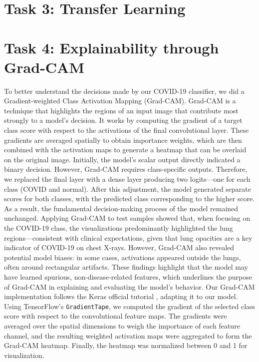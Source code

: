 \documentclass[conference]{IEEEtran}
\begin{document}
\section{Task 3: Transfer Learning}
\section{Task 4: Explainability through Grad-CAM}

To better understand the decisions made by our COVID-19 classifier, we did a Gradient-weighted Class Activation Mapping (Grad-CAM). Grad-CAM is a technique that highlights the regions of an input image that contribute most strongly to a model’s decision. It works by computing the gradient of a target class score with respect to the activations of the final convolutional layer. These gradients are averaged spatially to obtain importance weights, which are then combined with the activation maps to generate a heatmap that can be overlaid on the original image.
Initially, the model's scalar output directly indicated a binary decision. However, Grad-CAM requires class-specific outputs. Therefore, we replaced the final layer with a dense layer producing two logits—one for each class (COVID and normal). After this adjustment, the model generated separate scores for both classes, with the predicted class corresponding to the higher score. As a result, the fundamental decision-making process of the model remained unchanged.
Applying Grad-CAM to test samples showed that, when focusing on the COVID-19 class, the visualizations predominantly highlighted the lung regions—consistent with clinical expectations, given that lung opacities are a key indicator of COVID-19 on chest X-rays. However, Grad-CAM also revealed potential model biases: in some cases, activations appeared outside the lungs, often around rectangular artifacts. These findings highlight that the model may have learned spurious, non-disease-related features, which underlines the purpose of Grad-CAM in explaining and evaluating the model's behavior.
Our Grad-CAM implementation follows the Keras official tutorial \cite{keras_gradcam}, adapting it to our model. Using TensorFlow’s \texttt{GradientTape}, we computed the gradient of the selected class score with respect to the convolutional feature maps. The gradients were averaged over the spatial dimensions to weigh the importance of each feature channel, and the resulting weighted activation maps were aggregated to form the Grad-CAM heatmap. Finally, the heatmap was normalized between 0 and 1 for visualization.
\end{document}
